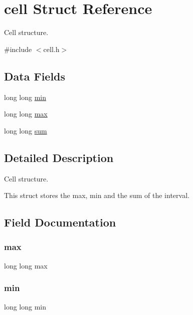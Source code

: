 \hypertarget{structcell}{}\section{cell Struct Reference}
\label{structcell}


Cell structure.  




{\ttfamily \#include $<$cell.\+h$>$}

\subsection*{Data Fields}
\begin{DoxyCompactItemize}
\item 
long long \hyperlink{structcell_a20ada1e15e57a5cfeada199892c8dfc3}{min}
\item 
long long \hyperlink{structcell_a3cc3af20c4a8a67e42db241f8e90472b}{max}
\item 
long long \hyperlink{structcell_a59baa572a76668b247ced468c54d047d}{sum}
\end{DoxyCompactItemize}


\subsection{Detailed Description}
Cell structure. 

This struct stores the max, min and the sum of the interval. 

\subsection{Field Documentation}
\mbox{\label{structcell_a3cc3af20c4a8a67e42db241f8e90472b}} 
\subsubsection{\texorpdfstring{max}{max}}
{\footnotesize\ttfamily long long max}

\mbox{\label{structcell_a20ada1e15e57a5cfeada199892c8dfc3}} 
\subsubsection{\texorpdfstring{min}{min}}
{\footnotesize\ttfamily long long min}

